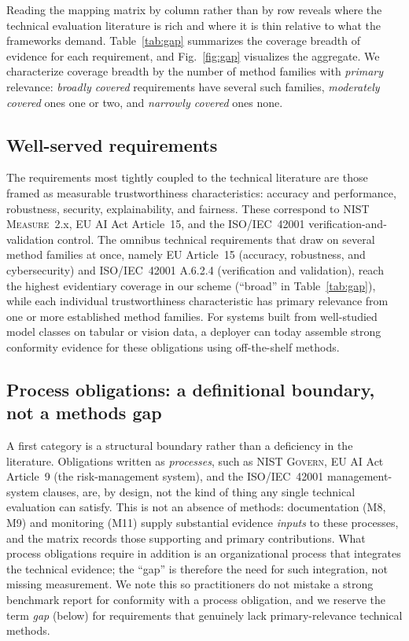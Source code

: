 Reading the mapping matrix by column rather than by row reveals where the technical
evaluation literature is rich and where it is thin relative to what the frameworks
demand. Table~\ref{tab:gap} summarizes the coverage breadth of evidence for each requirement, and
Fig.~\ref{fig:gap} visualizes the aggregate. We characterize coverage breadth by the
number of method families with \emph{primary} relevance: \emph{broadly covered} requirements
have several such families, \emph{moderately covered} ones one or two, and
\emph{narrowly covered} ones none.

\subsection{Well-served requirements}
The requirements most tightly coupled to the technical literature are those framed as
measurable trustworthiness characteristics: accuracy and performance, robustness,
security, explainability, and fairness. These correspond to NIST \textsc{Measure}~2.x,
EU AI Act Article~15, and the ISO/IEC~42001 verification-and-validation control. The
omnibus technical requirements that draw on several method families at once, namely EU
Article~15 (accuracy, robustness, and cybersecurity) and ISO/IEC~42001 A.6.2.4
(verification and validation), reach the highest evidentiary coverage in our scheme
(``broad'' in Table~\ref{tab:gap}), while each individual trustworthiness characteristic
has primary relevance from one or more established method families. For systems built from
well-studied model classes on tabular or vision data, a deployer can today assemble
strong conformity evidence for these obligations using off-the-shelf methods.

\subsection{Process obligations: a definitional boundary, not a methods gap}
A first category is a structural boundary rather than a deficiency in the literature.
Obligations written as \emph{processes}, such as NIST \textsc{Govern}, EU AI Act Article~9 (the
risk-management system), and the ISO/IEC~42001 management-system clauses, are, by design,
not the kind of thing any single technical evaluation can satisfy. This is not an absence
of methods: documentation (M8, M9) and monitoring (M11) supply substantial evidence
\emph{inputs} to these processes, and the matrix records those supporting and primary
contributions. What process obligations require in addition is an organizational process
that integrates the technical evidence; the ``gap'' is therefore the need for such
integration, not missing measurement. We note this so practitioners do not mistake a strong
benchmark report for conformity with a process obligation, and we reserve the term
\emph{gap} (below) for requirements that genuinely lack primary-relevance technical methods.


